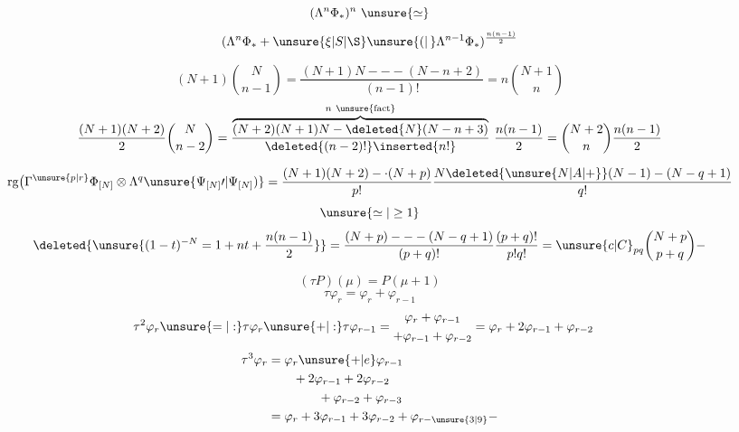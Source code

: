
\[
(\Lambda^n\Phi_*)^n\ \unsure{\simeq}
\]
\[
(\Lambda^n\Phi_*+\unsure{\xi|S|\S}\unsure{(|\,}\Lambda^{n-1}\Phi_*)^{\frac{n(n-1)}2}
\]

\[
(N+1)\binom{N}{n-1}
=\frac{(N+1)N---(N-n+2)}{(n-1)!}
=n\binom{N+1}{n}
\]
\[
\frac{(N+1)(N+2)}2\binom{N}{n-2}
=\frac{\overbrace{(N+2)(N+1)N-\deleted{N}(N-n+3)}^{n\ \text{\unsure{fact}}}}
{\deleted{(n-2)!}\inserted{n!}}\ \frac{n(n-1)}2
=\binom{N+2}{n}\frac{n(n-1)}2
\]

\[
\operatorname{rg}\bigl(\Gamma^{\unsure{p|r}}\Phi_{[N]}\otimes\Lambda^q\unsure{\Psi_{[N]}\prime|\Psi_{[N]})}
=\frac{(N+1)(N+2)-\cdot(N+p)}{p!}
\frac{N\deleted{\unsure{N|A|+}}(N-1)-(N-q+1)}{q!}
\]
\[
\unsure{\simeq|\ge1}
\]
\[
\deleted{\unsure{(1-t)^{-N}=1+nt+\frac{n(n-1)}2}}
=\frac{(N+p)---(N-q+1)}{(p+q)!}\frac{(p+q)!}{p!q!}
=\unsure{c|C}_{pq}\binom{N+p}{p+q}-
\]

\[
(\tau P)(\mu)=P(\mu+1)
\]
\[
\tau\varphi_r=\varphi_r+\varphi_{r-1}
\]
\[
\begin{aligned}
\tau^2\varphi_r&\unsure{=|:}\tau\varphi_r\unsure{+|:}\tau\varphi_{r-1}
=\begin{gathered}\varphi_r+\varphi_{r-1}\\+\varphi_{r-1}+\varphi_{r-2}\end{gathered}
=\varphi_r+2\varphi_{r-1}+\varphi_{r-2}
\end{aligned}
\]
\[
\begin{aligned}
\tau^3\varphi_r&=\varphi_r\unsure{+|e}\varphi_{r-1}\\
&\qquad+2\varphi_{r-1}+2\varphi_{r-2}\\
&\qquad\qquad+\varphi_{r-2}+\varphi_{r-3}\\
&=\varphi_r+3\varphi_{r-1}+3\varphi_{r-2}+\varphi_{r-\unsure{3|9}}-
\end{aligned}
\]


